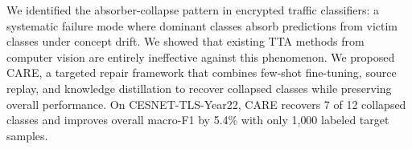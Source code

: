 \documentclass[journal]{IEEEtran}
\newcommand{\ours}{CARE}  %
\begin{document}
We identified the absorber-collapse pattern in encrypted traffic classifiers: a systematic failure mode where dominant classes absorb predictions from victim classes under concept drift.
We showed that existing TTA methods from computer vision are entirely ineffective against this phenomenon.
We proposed \ours{}, a targeted repair framework that combines few-shot fine-tuning, source replay, and knowledge distillation to recover collapsed classes while preserving overall performance.
On CESNET-TLS-Year22, \ours{} recovers 7 of 12 collapsed classes and improves overall macro-F1 by 5.4\% with only 1{,}000 labeled target samples.



\end{document}
